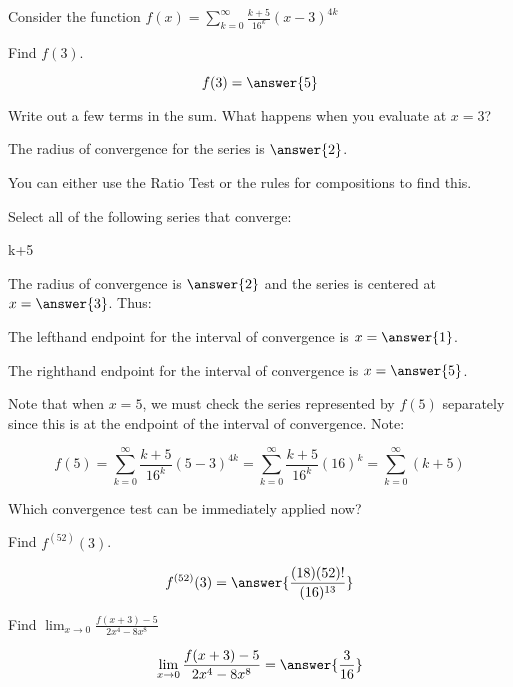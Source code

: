 \documentclass{ximera}
\author{Jim Talamo}
\begin{document}
\begin{exercise}
Consider the function $f(x) = \sum_{k=0}^{\infty} \frac{k+5}{16^k} (x-3)^{4k}$

\begin{exercise}
Find $f(3)$.

\[
f(3) = \answer{5}
\]
\begin{hint}
Write out a few terms in the sum.  What happens when you evaluate at $x=3$?
\end{hint}
\end{exercise}

\begin{exercise}
The radius of convergence for the series is $\answer{2}$.

\begin{hint}
You can either use the Ratio Test or the rules for compositions to find this.
\end{hint}

\end{exercise}
\begin{exercise}
Select all of the following series that converge:

\begin{selectAll}
k+5
\end{selectAll}

\begin{hint}
The radius of convergence is $\answer{2}$ and the series is centered at $x=\answer{3}$.  Thus:

The lefthand endpoint for the interval of convergence is $x=\answer{1}$.

The righthand endpoint for the interval of convergence is $x=\answer{5}$.

Note that when $x=5$, we must check the series represented by $f(5)$ separately since this is at the endpoint of the interval of convergence.  Note:

\[
f(5) = \sum_{k=0}^{\infty}  \frac{k+5}{16^k} (5-3)^{4k} = \sum_{k=0}^{\infty}  \frac{k+5}{16^k} (16)^k = \sum_{k=0}^{\infty} (k+5)
\]

Which convergence test can be immediately applied now?
\end{hint}

\end{exercise}
\begin{exercise}
Find $f^{(52)}(3)$.

\[
f^{(52)}(3) = \answer{\frac{(18)(52)!}{(16)^{13}}}
\]
\end{exercise}
\begin{exercise}
Find $\lim_{x \to 0} \frac{f(x+3)-5}{2x^4-8x^8}$

\[
\lim_{x \to 0} \frac{f(x+3)-5}{2x^4-8x^8} = \answer{\frac{3}{16}}
\]
\end{exercise}


\end{exercise}
\end{document}
